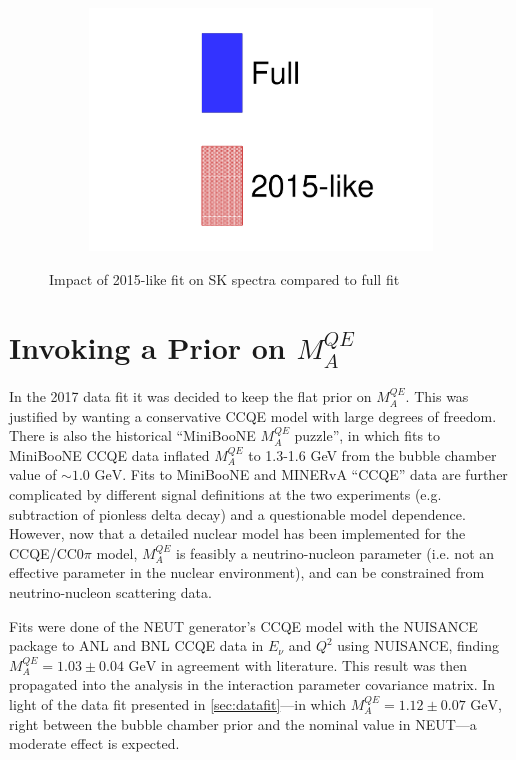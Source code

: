 \begin{figure}[h]
\begin{subfigure}[t]{0.32\textwidth}
		\includegraphics[width=\textwidth, trim={0mm 0mm 0mm 0mm}, clip, page=6]{figures/mach3/data/alt/try_2017_fit_on_sk_spectra_posterior_sk_error_2015like_spectra}
	\end{subfigure}
	
	\caption{Impact of 2015-like fit on SK spectra compared to full fit}
	\label{fig:sk_2015like}
\end{figure}

\section{Invoking a Prior on $M_{A}^{QE}$}
In the 2017 data fit it was decided to keep the flat prior on $M_A^{QE}$. This was justified by wanting a conservative CCQE model with large degrees of freedom. There is also the historical ``MiniBooNE $M_A^{QE}$ puzzle'', in which fits to MiniBooNE CCQE data inflated $M_A^{QE}$ to 1.3-1.6 GeV from the bubble chamber value of $\sim1.0\text{ GeV}$. Fits to MiniBooNE and MINERvA ``CCQE'' data are further complicated by different signal definitions at the two experiments (e.g. subtraction of pionless delta decay) and a questionable model dependence\cite{ccqe_tuning}. However, now that a detailed nuclear model has been implemented for the CCQE/CC0$\pi$ model, $M_A^{QE}$ is feasibly a neutrino-nucleon parameter (i.e. not an effective parameter in the nuclear environment), and can be constrained from neutrino-nucleon scattering data.

Fits were done of the NEUT generator's CCQE model with the NUISANCE package to ANL\cite{ANL_CCQE1,ANL_CCQE2} and BNL\cite{BNL_CCQE} CCQE data in $E_\nu$ and $Q^2$ using NUISANCE\cite{NUISANCE}, finding $M_A^{QE}=1.03\pm0.04\text{ GeV}$ in agreement with literature\cite{maqe_fit}. This result was then propagated into the analysis in the interaction parameter covariance matrix. In light of the data fit presented in \autoref{sec:datafit}---in which $M_A^{QE}=1.12\pm0.07\text{ GeV}$, right between the bubble chamber prior and the nominal value in NEUT---a moderate effect is expected.

